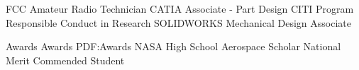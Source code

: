 \documentclass[letterpaper,ddMMMyyyy,nonstopmode]{simpleresumecv}
\begin{document}
\begin{Body}

		\Entry FCC Amateur Radio Technician
		\Entry CATIA Associate - Part Design
		\Entry CITI Program Responsible Conduct in Research
		\Entry SOLIDWORKS Mechanical Design Associate



		\Section
		{Awards}
		{Awards}
		{PDF:Awards}
		\Entry NASA High School Aerospace Scholar
		\Entry National Merit Commended Student
	\end{Body}
\end{document}
